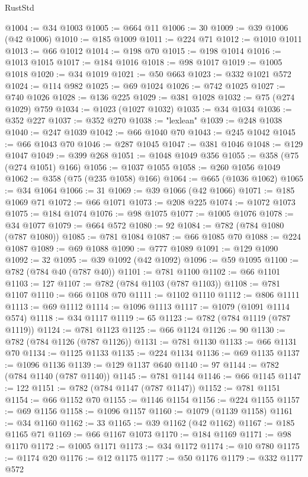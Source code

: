 \begin{lexlean}{RustStd}
\begin{coremodule}
{\begin{coremodule}
{{{{{{{{{{{{{{{{{{{{{{{{{{{{{{{{{{{{{{{{{{{@1004 := @34 @1003
@1005 := @664 @11
@1006 := 30
@1009 := @39 @1006 (@42 @1006)
@1010 := @185 @1009
@1011 := @224 @71
@1012 := @1010 @1011
@1013 := @66 @1012
@1014 := @198 @70
@1015 := @198 @1014
@1016 := @1013 @1015
@1017 := @184 @1016
@1018 := @98 @1017
@1019 := @1005 @1018
@1020 := @34 @1019
@1021 := @50 @663
@1023 := @332 @1021 @572
@1024 := @114 @982
@1025 := @69 @1024
@1026 := @742 @1025
@1027 := @740 @1026
@1028 := @136 @225
@1029 := @381 @1028
@1032 := @75 (@274 @1029) @759
@1034 := @1023 (@1027 @1032)
@1035 := @34 @1034
@1036 := @352 @227
@1037 := @352 @270
@1038 := "lexlean"
@1039 := @248 @1038
@1040 := @247 @1039
@1042 := @66 @1040 @70
@1043 := @245 @1042
@1045 := @66 @1043 @70
@1046 := @287 @1045
@1047 := @381 @1046
@1048 := @129 @1047
@1049 := @399 @268
@1051 := @1048 @1049 @356
@1055 := @358 (@75 (@274 @1051) @166)
@1056 := @1037 @1055
@1058 := @260 @1056 @1049
@1062 := @358 (@75 (@235 @1058) @166)
@1064 := @665 (@1036 @1062)
@1065 := @34 @1064
@1066 := 31
@1069 := @39 @1066 (@42 @1066)
@1071 := @185 @1069 @71
@1072 := @66 @1071
@1073 := @208 @225
@1074 := @1072 @1073
@1075 := @184 @1074
@1076 := @98 @1075
@1077 := @1005 @1076
@1078 := @34 @1077
@1079 := @664 @572
@1080 := 92
@1084 := @782 (@784 @1080 (@787 @1080))
@1085 := @781 @1084
@1087 := @66 @1085 @70
@1088 := @224 @1087
@1089 := @69 @1088
@1090 := @777 @1089
@1091 := @129 @1090
@1092 := 32
@1095 := @39 @1092 (@42 @1092)
@1096 := @59 @1095
@1100 := @782 (@784 @40 (@787 @40))
@1101 := @781 @1100
@1102 := @66 @1101
@1103 := 127
@1107 := @782 (@784 @1103 (@787 @1103))
@1108 := @781 @1107
@1110 := @66 @1108 @70
@1111 := @1102 @1110
@1112 := @806 @1111
@1113 := @69 @1112
@1114 := @1096 @1113
@1117 := @1079 (@1091 @1114 @574)
@1118 := @34 @1117
@1119 := 65
@1123 := @782 (@784 @1119 (@787 @1119))
@1124 := @781 @1123
@1125 := @66 @1124
@1126 := 90
@1130 := @782 (@784 @1126 (@787 @1126))
@1131 := @781 @1130
@1133 := @66 @1131 @70
@1134 := @1125 @1133
@1135 := @224 @1134
@1136 := @69 @1135
@1137 := @1096 @1136
@1139 := @129 @1137 @640
@1140 := 97
@1144 := @782 (@784 @1140 (@787 @1140))
@1145 := @781 @1144
@1146 := @66 @1145
@1147 := 122
@1151 := @782 (@784 @1147 (@787 @1147))
@1152 := @781 @1151
@1154 := @66 @1152 @70
@1155 := @1146 @1154
@1156 := @224 @1155
@1157 := @69 @1156
@1158 := @1096 @1157
@1160 := @1079 (@1139 @1158)
@1161 := @34 @1160
@1162 := 33
@1165 := @39 @1162 (@42 @1162)
@1167 := @185 @1165 @71
@1169 := @66 @1167 @1073
@1170 := @184 @1169
@1171 := @98 @1170
@1172 := @1005 @1171
@1173 := @34 @1172
@1174 := @10 @780
@1175 := @1174 @20
@1176 := @12 @1175
@1177 := @50 @1176
@1179 := @332 @1177 @572
}}}}}}}}}}}}}}}}}}}}}}}}}}}}}}}}}}}}}}}}}}}
\end{coremodule}}
\end{coremodule}
\end{lexlean}
